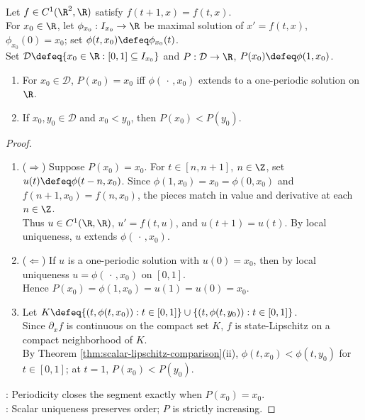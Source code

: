 \begin{proposition} \label{prop:scalar-poincare-periodic-fixed-point} \\
Let $f\in C^1(\R^2,\R)$ satisfy $f(t+1,x)=f(t,x)$.\\
For $x_0\in\R$, let $\phi_{x_0}:I_{x_0}\to\R$ be maximal solution of $x'=f(t,x)$, $\phi_{x_0}(0)=x_0$; set $\phi(t,x_0)\defeq\phi_{x_0}(t)$.\\
Set $\mathcal{D}\defeq\{x_0\in\R:[0,1]\subseteq I_{x_0}\}$ and $P:\mathcal{D}\to\R$, $P(x_0)\defeq\phi(1,x_0)$.
\begin{enumerate}[label=(\roman*)]
\setlength{\itemsep}{0pt}
\item For $x_0\in\mathcal{D}$, $P(x_0)=x_0$ iff $\phi(\,\cdot\,,x_0)$ extends to a one-periodic solution on $\R$.
\item If $x_0,y_0\in\mathcal{D}$ and $x_0<y_0$, then $P(x_0)<P(y_0)$.
\end{enumerate}
\begin{proof}
\begin{enumerate}[label=(\roman*)]
\setlength{\itemsep}{0pt}
\item[$(i)$] ($\Rightarrow$) Suppose $P(x_0)=x_0$. For $t\in[n,n+1]$, $n\in\Z$, set $u(t)\defeq\phi(t-n,x_0)$. Since $\phi(1,x_0)=x_0=\phi(0,x_0)$ and $f(n+1,x_0)=f(n,x_0)$, the pieces match in value and derivative at each $n\in\Z$.\\
Thus $u\in C^1(\R,\R)$, $u'=f(t,u)$, and $u(t+1)=u(t)$. By local uniqueness, $u$ extends $\phi(\,\cdot\,,x_0)$.
\item[$(i)$] ($\Leftarrow$) If $u$ is a one-periodic solution with $u(0)=x_0$, then by local uniqueness $u=\phi(\,\cdot\,,x_0)$ on $[0,1]$.\\
Hence $P(x_0)=\phi(1,x_0)=u(1)=u(0)=x_0$.
\item[$(ii)$] Let $K\defeq\{(t,\phi(t,x_0)):t\in[0,1]\}\cup\{(t,\phi(t,y_0)):t\in[0,1]\}$.\\
Since $\partial_x f$ is continuous on the compact set $K$, $f$ is state-Lipschitz on a compact neighborhood of $K$.\\
By Theorem \ref{thm:scalar-lipschitz-comparison}(ii), $\phi(t,x_0)<\phi(t,y_0)$ for $t\in[0,1]$; at $t=1$, $P(x_0)<P(y_0)$.
\end{enumerate}
: Periodicity closes the segment exactly when $P(x_0)=x_0$.\\
: Scalar uniqueness preserves order; $P$ is strictly increasing.
\end{proof}
\end{proposition}

